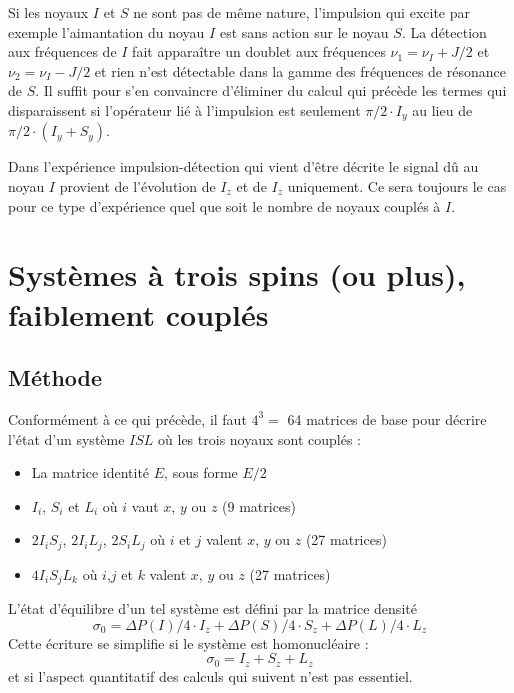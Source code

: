 Si les noyaux $I$ et $S$ ne sont pas de même nature, 
l'impulsion qui excite par exemple l'aimantation du noyau $I$
est sans action sur le noyau $S$.
La détection aux fréquences de $I$ fait 
apparaître un doublet aux fréquences $\nu_1 = \nu_I + J/2$ et
$\nu_2 = \nu_I - J/2$ et rien n'est détectable dans la gamme des
fréquences de résonance de $S$.
Il suffit pour s'en convaincre d'éliminer du calcul
qui précède les termes qui disparaissent si l'opérateur
lié à l'impulsion est seulement $\pi/2 \cdot I_y $
au lieu de $\pi/2 \cdot (I_y + S_y)$.

Dans l'expérience impulsion-détection qui vient d'être décrite 
le signal dû au
noyau $I$ provient de l'évolution de $I_z$ et de $I_z$ uniquement. 
Ce sera toujours le cas pour ce type d'expérience quel que 
soit le nombre de noyaux couplés à $I$.

\section{Systèmes à trois spins (ou plus), faiblement couplés}

\subsection{Méthode}
Conformément à ce qui précède, il faut $4^3 =$ 64 matrices de base pour
décrire l'état d'un système $ISL$ où les trois noyaux sont couplés :

\begin{itemize}
\item La matrice identité $E$, sous forme $E/2$
\item $I_i$, $S_i$ et $L_i$ où $i$ vaut $x$, $y$ ou $z$ (9 matrices)
\item $2I_iS_j$, $2I_iL_j$, $2S_iL_j$ où $i$ et $j$ 
valent $x$, $y$ ou $z$ (27 matrices)
\item $4I_iS_jL_k$ où $i$,$j$ et $k$ valent $x$, $y$ ou $z$ (27 matrices)
\end{itemize}
L'état d'équilibre d'un tel système est défini par la matrice densité 
\begin{equation}
\sigma_0 = \Delta P(I)/4 \cdot I_z + \Delta P(S)/4 \cdot S_z + 
\Delta P(L)/4 \cdot L_z
\end{equation}
Cette écriture se simplifie si le système est homonucléaire : 
\begin{equation}
\sigma_0 = I_z + S_z + L_z
\end{equation}
et si l'aspect quantitatif des calculs qui suivent n'est pas
essentiel.

